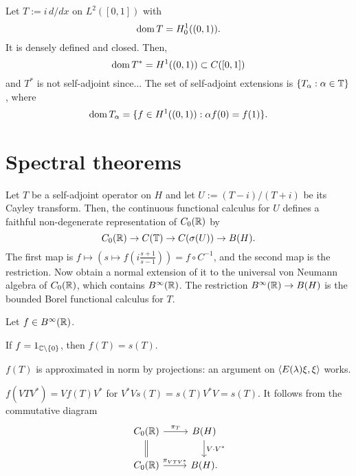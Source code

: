 \documentclass{../../large}
\begin{document}
\begin{ex*}
Let $T:=i\,d/dx$ on $L^2([0,1])$ with
\[\operatorname{dom} T=H_0^1((0,1)).\]
It is densely defined and closed.
Then,
\[\operatorname{dom} T^*=H^1((0,1))\subset C([0,1])\]
and $T^*$ is not self-adjoint since...
The set of self-adjoint extensions is $\{T_\alpha:\alpha\in\mathbb{T}\}$, where
\[\operatorname{dom} T_\alpha=\{f\in H^1((0,1)):\alpha f(0)=f(1)\}.\]
\end{ex*}



\section{Spectral theorems}
\begin{prb}
Let $T$ be a self-adjoint operator on $H$ and let $U:=(T-i)/(T+i)$ be its Cayley transform.
Then, the continuous functional calculus for $U$ defines a faithful non-degenerate representation of $C_0(\mathbb{R})$ by
\[C_0(\mathbb{R})\to C(\mathbb{T})\to C(\sigma(U))\to B(H).\]
The first map is $f\mapsto(s\mapsto f(i\frac{s+1}{s-1}))=f\circ C^{-1}$, and the second map is the restriction.
Now obtain a normal extension of it to the universal von Neumann algebra of $C_0(\mathbb{R})$, which contains $B^\infty(\mathbb{R})$.
The restriction $B^\infty(\mathbb{R})\to B(H)$ is the bounded Borel functional calculus for $T$.
\begin{parts}
\item 
\end{parts}
\end{prb}

\begin{prb}
Let $f\in B^\infty(\mathbb{R})$.
\begin{parts}
\item If $f=1_{\mathbb{C}\setminus\{0\}}$, then $f(T)=s(T)$.
\item $f(T)$ is approximated in norm by projections: an argument on $\langle E(\lambda)\xi,\xi\rangle$ works.
\item $f(VTV^*)=Vf(T)V^*$ for $V^*Vs(T)=s(T)V^*V=s(T)$. It follows from the commutative diagram
\[\begin{tikzcd}
C_0(\R)\ar[equals]{d}\ar{r}{\pi_T} & B(H) \ar{d}{V\cdot V^*}\\
C_0(\R)\ar{r}{\pi_{VTV^*}} & B(H).
\end{tikzcd}\]
\end{parts}
\end{prb}
\end{document}
